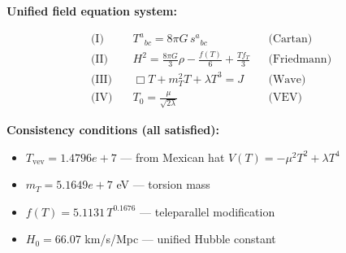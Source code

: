 
\textbf{Unified field equation system:}

\begin{align}
  \text{(I)} \quad & T^a{}_{bc} = 8\pi G \, s^a{}_{bc} && \text{(Cartan)} \\
  \text{(II)} \quad & H^2 = \frac{8\pi G}{3}\rho - \frac{f(T)}{6} + \frac{Tf_T}{3} && \text{(Friedmann)} \\
  \text{(III)} \quad & \Box T + m_T^2 T + \lambda T^3 = J && \text{(Wave)} \\
  \text{(IV)} \quad & T_0 = \frac{\mu}{\sqrt{2\lambda}} && \text{(VEV)}
\end{align}

\textbf{Consistency conditions (all satisfied):}
\begin{itemize}
  \item $T_{\text{vev}} = 1.4796e+7$ — from Mexican hat $V(T) = -\mu^2 T^2 + \lambda T^4$
  \item $m_T = 5.1649e+7$ eV — torsion mass
  \item $f(T) = 5.1131 \, T^{0.1676}$ — teleparallel modification
  \item $H_0 = 66.07$ km/s/Mpc — unified Hubble constant
\end{itemize}